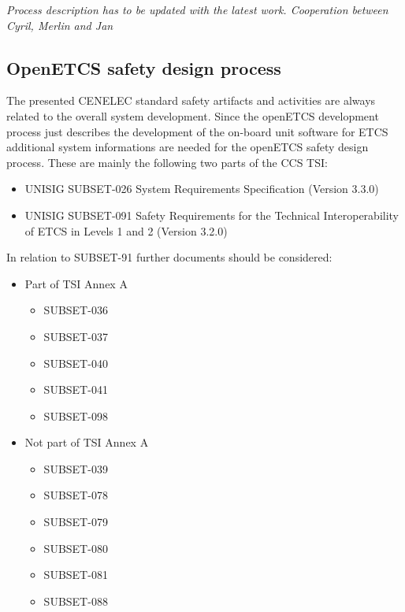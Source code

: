 \documentclass{template/openetcs_report}
\begin{document}
\textit{Process description has to be updated with the latest work. Cooperation between Cyril, Merlin and Jan}

\subsection{OpenETCS safety design process}

The presented CENELEC standard safety artifacts and activities are always related to the overall system development. Since the openETCS development process just describes the development of the on-board unit software for ETCS additional system informations are needed for the openETCS safety design process. These are mainly the following two parts of the CCS TSI:

\begin{itemize}
\item UNISIG SUBSET-026	System Requirements Specification 	(Version 3.3.0)
\item UNISIG SUBSET-091 Safety Requirements for the Technical Interoperability of ETCS in Levels 1 and 2 	(Version 3.2.0)
\end{itemize}

In relation to SUBSET-91 further documents should be considered:

\begin{itemize}
\item Part of TSI Annex A
	\begin{itemize}
	\item SUBSET-036
	\item SUBSET-037
	\item SUBSET-040
	\item SUBSET-041
	\item SUBSET-098
	\end{itemize}
	
\item Not part of TSI Annex A
	\begin{itemize}
	\item SUBSET-039
	\item SUBSET-078
	\item SUBSET-079
	\item SUBSET-080
	\item SUBSET-081
	\item SUBSET-088
	\end{itemize}
\end{itemize}
\end{document}

